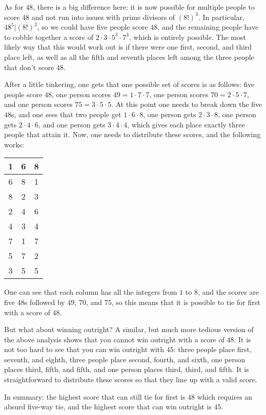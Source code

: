 \documentclass[11pt]{article}
\theoremstyle{definition}
\begin{document}
As for $48$, there is a big difference here: it is now possible for multiple people to score $48$ and not run into issues with prime divisors of $(8!)^3$.  In particular, $48^5|(8!)^3$, so we could have five people score $48$, and the remaining people have to cobble together a score of $2\cdot3\cdot5^3\cdot 7^3$, which is entirely possible.  The most likely way that this would work out is if there were one first, second, and third place left, as well as all the fifth and seventh places left among the three people that don't score $48$.

After a little tinkering, one gets that one possible set of scores is as follows: five people score $48$, one person scores $49 = 1\cdot7 \cdot 7$, one person scores $70 = 2\cdot 5\cdot 7$, and one person scores $75 = 3\cdot 5\cdot 5$.  At this point one needs to break down the five $48$s, and one sees that two people get $1 \cdot 6 \cdot 8$, one person gets $2\cdot3\cdot8$, one person gets $2\cdot4\cdot6$, and one person gets $3\cdot4\cdot4$, which gives each place exactly three people that attain it.  Now, one needs to distribute these scores, and the following works:

\begin{tabular}{|c|c|c|}
\hline
1 & 6 & 8 \\\hline
6 & 8 & 1 \\\hline
8 & 2 & 3 \\\hline
2 & 4 & 6 \\\hline
4 & 3 & 4 \\\hline
7 & 1 & 7 \\\hline
5 & 7 & 2 \\\hline
3 & 5 & 5 \\\hline
\end{tabular}

One can see that each column has all the integers from $1$ to $8$, and the scores are five $48$s followed by $49$, $70$, and $75$, so this means that it is possible to tie for first with a score of $48$.

But what about winning outright?  A similar, but much more tedious version of the above analysis shows that you cannot win outright with a score of $48$.  It is not too hard to see that you can win outright with $45$: three people place first, seventh, and eighth, three people place second, fourth, and sixth, one person places third, fifth, and fifth, and one person places third, third, and fifth.  It is straightforward to distribute these scores so that they line up with a valid score.

In summary: the highest score that can still tie for first is $48$ which requires an absurd five-way tie, and the highest score that can win outright is $45$.
\end{document}
